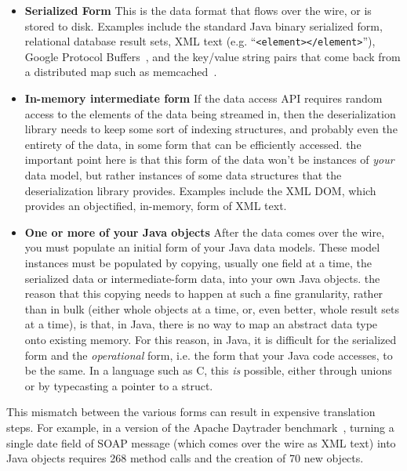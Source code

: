 \begin{itemize}

\item \textbf{Serialized Form} This is the data format that flows over the wire,
or is stored to disk. Examples include the standard Java binary serialized form,
relational database result sets, XML text (e.g. ``\verb+<element></element>+''),
Google Protocol Buffers~\cite{google-protocol-buffers}, and the key/value string
pairs that come back from a distributed map such as memcached~\cite{memcached}.

\item \textbf{In-memory intermediate form} If the data access API requires
random access to the elements of the data being streamed in, then the
deserialization library needs to keep some sort of indexing structures, and
probably even the entirety of the data, in some form that can be efficiently
accessed. the important point here is that this form of the data won't be
instances of \emph{your} data model, but rather instances of some data
structures that the deserialization library provides. Examples include the XML
DOM, which provides an objectified, in-memory, form of XML text.

\item \textbf{One or more of your Java objects} After the data comes over the
wire, you must populate an initial form of your Java data models. These model
instances must be populated by copying, usually one field at a time, the
serialized data or intermediate-form data, into your own Java objects. the
reason that this copying needs to happen at such a fine granularity, rather than
in bulk (either whole objects at a time, or, even better, whole result sets at a
time), is that, in Java, there is no way to map an abstract data type onto
existing memory. For this reason, in Java, it is difficult for the serialized
form and the \emph{operational} form, i.e. the form that your Java code
accesses, to be the same. In a language such as C, this \emph{is} possible,
either through unions or by typecasting a pointer to a struct.
\end{itemize}

This mismatch between the various forms can result in expensive translation
steps. For example, in a version of the Apache Daytrader
benchmark~\cite{daytrader}, turning a single date field of SOAP message (which
comes over the wire as XML text) into Java objects requires 268 method calls and
the creation of 70 new objects.

